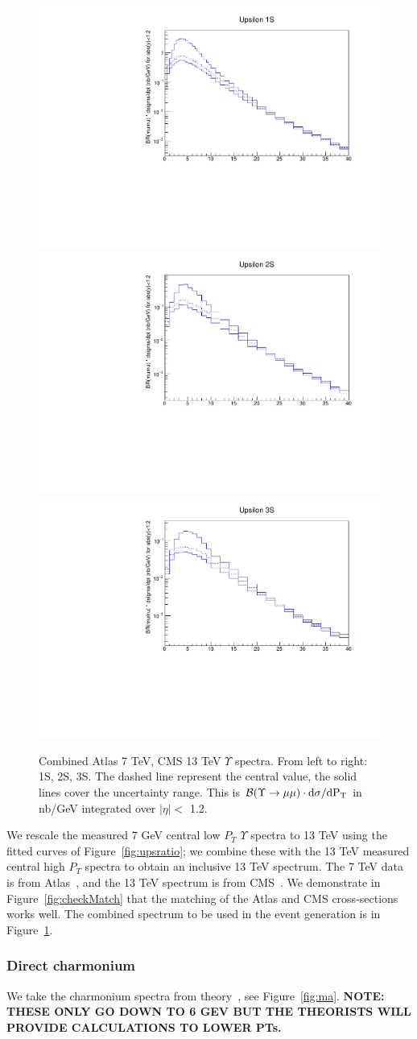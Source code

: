\documentclass[12pt]{article}
\begin{document}
\begin{figure}
\begin{adjustwidth}{-3cm}{-3cm}
\centering
\includegraphics[width=0.32\linewidth]{../oniaDirect/upsilon/ups1s-full.pdf}
\includegraphics[width=0.32\linewidth]{../oniaDirect/upsilon/ups2s-full.pdf}
\includegraphics[width=0.32\linewidth]{../oniaDirect/upsilon/ups3s-full.pdf}
\end{adjustwidth}
\caption{\protect Combined Atlas 7 TeV, CMS 13 TeV $\Upsilon$ spectra.
  From left to right: 1S, 2S, 3S. 
The dashed line represent the central value, the solid
  lines cover the uncertainty range.  This is ${\cal B}(\Upsilon \to \mu\mu) \cdot
  \rm{d}\sigma/\rm{d}P_T$ in nb/GeV integrated
  over $|\eta| <$ 1.2.}
\label{fig:upsFinal}
\end{figure}

  
  We rescale the measured 7 GeV central low $P_T$ $\Upsilon$ spectra to 13 TeV using the
  fitted curves of Figure~\ref{fig:upsratio};  we combine these with the 13 TeV measured
  central high $P_T$ spectra to obtain an inclusive 13 TeV spectrum.  The 7 TeV data
  is from Atlas~\cite{Aad:2012dlq}, and the 13 TeV spectrum is from
  CMS~\cite{Sirunyan:2017qdw}. We demonstrate in Figure~\ref{fig:checkMatch} that the
  matching of the Atlas and CMS cross-sections works well.  The combined
  spectrum to be used in the event generation is in Figure~\ref{fig:upsFinal}.


\subsubsection{Direct charmonium}
We take the charmonium spectra from theory~\cite{Ma:2010yw, Ma:2010jj},
see Figure~\ref{fig:ma}.  {\bf NOTE: THESE ONLY GO DOWN TO 6 GEV BUT
  THE THEORISTS WILL PROVIDE CALCULATIONS TO LOWER PTs.}
\end{document}
